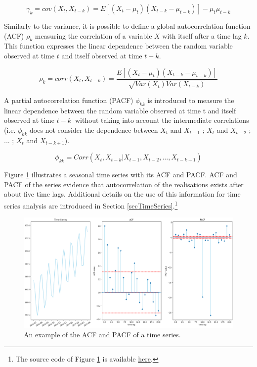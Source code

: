 \begin{equation}
\gamma_k=cov\left(X_t,X_{t-k}\right)=E\left[\left(X_t-\mu_t\right)\left(X_{t-k}-\mu_{t-k}\right)\right]-\mu_t\mu_{t-k}
\label{eq_autocovariance}
\end{equation}

Similarly to the variance, it is possible to define a global autocorrelation function (ACF) $\rho_k$ measuring the correlation of a variable $X$ with itself after a time lag $k$. This function expresses the linear dependence between the random variable observed at time $t$ and itself observed at time $t-k$.

\begin{equation}
\rho_k=corr\left(X_t,X_{t-k}\right)=\frac{E[(X_t-\mu_t)(X_{t-k}-\mu_{t-k})]}{\sqrt{Var(X_t)Var(X_{t-k})}}
\label{eq_ACF}
\end{equation}

A partial autocorrelation function (PACF) $\phi_{kk}$ is introduced to measure the linear dependence between the random variable observed at time t and itself observed at time $t-k\ $ without taking into account the intermediate correlations (i.e. $\phi_{kk}$ does not consider the dependence between $X_t$ and $X_{t-1}$ ; $X_t$ and $X_{t-2}$ ; ... ; $X_t$ and $X_{t-k+1}$).

\begin{equation}
\phi_{kk}=Corr(X_t,X_{t-k}|X_{t-1},X_{t-2},\ldots,X_{t-k+1})
\label{eq_PACF}
\end{equation}

Figure \ref{fig_ACFPACF} illustrates a seasonal time series with its ACF and PACF. ACF and PACF of the series evidence that autocorrelation of the realisations exists after about five time lags. Additional details on the use of this information for time series analysis are introduced in Section \ref{secTimeSeries}.\footnote{The source code of Figure \ref{fig_ACFPACF} is available \href{https://github.com/aletuf93/logproj/blob/master/examples/02.\%20Time\%20Series.ipynb}{here}.}

\begin{figure}[hbt!]
\centering
\includegraphics[width=1\textwidth]{SectionLetsMath/elemStat_figures/fig_ACFPACF.png}
\captionsetup{type=figure}
\caption{An example of the ACF and PACF of a time series.}
\label{fig_ACFPACF}
\end{figure}

